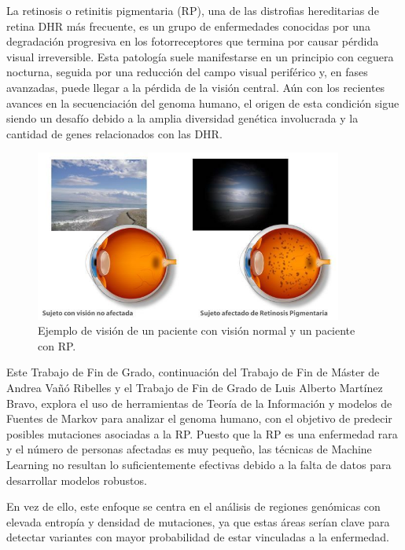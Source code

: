 \documentclass[11pt,spanish,listoffigures,listoftables]{tfgetsinf}
\begin{document}
La retinosis o retinitis pigmentaria (RP), una de las distrofias hereditarias de retina DHR más frecuente, es un grupo de enfermedades conocidas por una degradación progresiva en los fotorreceptores que termina por causar pérdida visual irreversible. Esta patología suele manifestarse en un principio con ceguera nocturna, seguida por una reducción del campo visual periférico y, en fases avanzadas, puede llegar a la pérdida de la visión central\cite{NAT}. Aún con los recientes avances en la secuenciación del genoma humano, el origen de esta condición sigue siendo un desafío debido a la amplia diversidad genética involucrada y la cantidad de genes relacionados con las DHR. 

\begin{figure}[H]
   \centering
   \includegraphics[width=0.9\textwidth]{Retinosis-Pigmetaria.jpg}
   \caption{Ejemplo de visión de un paciente con visión normal y un paciente con RP.}
   \label{fig:etiqueta_opcional2}
\end{figure}

Este Trabajo de Fin de Grado, continuación del Trabajo de Fin de Máster de Andrea Vañó Ribelles y el Trabajo de Fin de Grado de Luis Alberto Martínez Bravo, explora el uso de herramientas de Teoría de la Información y modelos de Fuentes de Markov para analizar el genoma humano, con el objetivo de predecir posibles mutaciones asociadas a la RP. Puesto que la RP es una enfermedad rara y el número de personas afectadas es muy pequeño, las técnicas de Machine Learning no resultan lo suficientemente efectivas debido a la falta de datos para desarrollar modelos robustos. 

 

En vez de ello, este enfoque se centra en el análisis de regiones genómicas con elevada entropía y densidad de mutaciones, ya que estas áreas serían clave para detectar variantes con mayor probabilidad de estar vinculadas a la enfermedad. 
\end{document}
